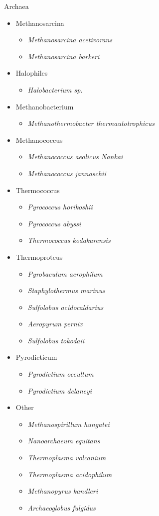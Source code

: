 \documentclass[10pt,letterpaper]{article}
\begin{document}
Archaea

\begin{itemize}
	\item Methanosarcina
	\begin{itemize}
		\item \textit{Methanosarcina acetivorans}
		\item \textit{Methanosarcina barkeri}
	\end{itemize}
	\item Halophiles
	\begin{itemize}
		\item \textit{Halobacterium sp.}
	\end{itemize}
	\item Methanobacterium
	\begin{itemize}
		\item \textit{Methanothermobacter thermautotrophicus}
	\end{itemize}
	\item Methanococcus
	\begin{itemize}
		\item \textit{Methanococcus aeolicus Nankai}
		\item \textit{Methanococcus jannaschii}
	\end{itemize}
	\item Thermococcus
	\begin{itemize}
		\item \textit{Pyrococcus horikoshii}
		\item \textit{Pyrococcus abyssi}
		\item \textit{Thermococcus kodakarensis}
	\end{itemize}
	\item Thermoproteus
	\begin{itemize}
		\item \textit{Pyrobaculum aerophilum}
		\item \textit{Staphylothermus marinus}
		\item \textit{Sulfolobus acidocaldarius}
		\item \textit{Aeropyrum pernix}
		\item \textit{Sulfolobus tokodaii}
	\end{itemize}
	\item Pyrodicticum
	\begin{itemize}
		\item \textit{Pyrodictium occultum}
		\item \textit{Pyrodictium delaneyi}
	\end{itemize}
	\item Other
	\begin{itemize}
		\item \textit{Methanospirillum hungatei}
		\item \textit{Nanoarchaeum equitans}
		\item \textit{Thermoplasma volcanium}
		\item \textit{Thermoplasma acidophilum}
		\item \textit{Methanopyrus kandleri}
		\item \textit{Archaeoglobus fulgidus}
	\end{itemize}
\end{itemize}
\end{document}
